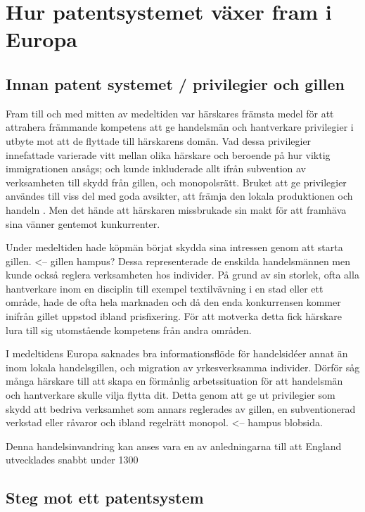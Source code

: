 \section{Hur patentsystemet växer fram i Europa}

\subsection{Innan patent systemet / privilegier och gillen} %
\label{sub:innan_patent_systemet}

Fram till och med mitten av medeltiden var härskares främsta medel för att
attrahera främmande kompetens att ge handelsmän och hantverkare privilegier i
utbyte mot att de flyttade till härskarens domän. 
Vad dessa privilegier innefattade varierade vitt mellan olika härskare och
beroende på hur viktig immigrationen ansågs; och kunde inkluderade allt ifrån
subvention av verksamheten till skydd från gillen, och monopolsrätt. 
Bruket att ge privilegier användes till viss del med goda avsikter, att främja
den lokala produktionen och handeln \cite{nard}. Men det hände att härskaren
missbrukade sin makt för att framhäva sina vänner gentemot kunkurrenter.

Under medeltiden hade köpmän börjat skydda sina intressen genom att starta
gillen. <-- gillen hampus?
Dessa representerade de enskilda handelsmännen men kunde också reglera
verksamheten hos individer.
På grund av sin storlek, ofta alla hantverkare inom en disciplin till exempel
textilvävning i en stad eller ett område, hade de ofta hela marknaden och då
den enda konkurrensen kommer inifrån gillet uppstod ibland prisfixering. 
För att motverka detta fick härskare lura till sig utomstående kompetens från
andra områden.

I medeltidens Europa saknades bra informationsflöde för handelsidéer annat än
inom lokala handelsgillen, och migration av yrkesverksamma individer. 
Dörför såg många härskare till att skapa en förmånlig arbetssituation för att
handelsmän och hantverkare skulle vilja flytta dit. 
Detta genom att ge ut privilegier som skydd att bedriva verksamhet som annars
reglerades av gillen, en subventionerad verkstad eller råvaror och ibland
regelrätt monopol. <-- hampus blobsida. 

Denna handelsinvandring kan anses vara en av anledningarna till att England
utvecklades snabbt under 1300


\subsection{Steg mot ett patentsystem}

